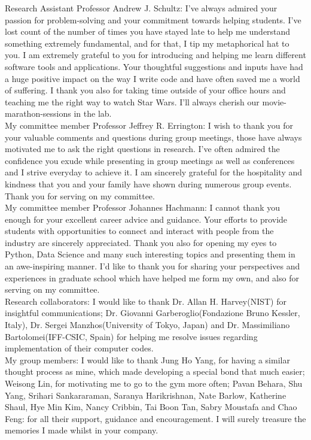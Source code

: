 \noindent Research Assistant Professor Andrew J. Schultz: I've always admired your passion for problem-solving and your commitment towards helping students. I've lost count of the number of times you have stayed late to help me understand something extremely fundamental, and for that, I tip my metaphorical hat to you. I am extremely grateful to you for introducing and helping me learn different software tools and applications. Your thoughtful suggestions and inputs have had a huge positive impact on the way I write code and have often saved me a world of suffering. I thank you also for taking time outside of your office hours and teaching me the right way to watch Star Wars. I'll always cherish our movie-marathon-sessions in the lab.\\

\noindent My committee member Professor Jeffrey R. Errington: I wish to thank you for your valuable comments and questions during group meetings, those have always motivated me to ask the right questions in research. I've often admired the confidence you exude while presenting in group meetings as well as conferences and I strive everyday to achieve it. I am sincerely grateful for the hospitality and kindness that you and your family have shown during numerous group events.  Thank you for serving on my committee.\\

\noindent My committee member Professor Johannes Hachmann: I cannot thank you enough for your excellent career advice and guidance. Your efforts to provide students with opportunities to connect and interact with people from the industry are sincerely appreciated. Thank you also for opening my eyes to Python, Data Science and many such interesting topics and presenting them in an awe-inspiring manner. I'd like to thank you for sharing your perspectives and experiences in graduate school which have helped me form my own, and also for serving on my committee.\\

\noindent Research collaborators: I would like to thank Dr. Allan H. Harvey(NIST) for insightful communications; Dr. Giovanni Garberoglio(Fondazione Bruno Kessler, Italy), Dr. Sergei Manzhos(University of Tokyo, Japan) and Dr. Massimiliano Bartolomei(IFF-CSIC, Spain) for helping me resolve issues regarding implementation of their computer codes.\\

\noindent My group members: I would like to thank Jung Ho Yang, for having a similar thought process as mine, which made developing a special bond that much easier; Weisong Lin, for motivating me to go to the gym more often; Pavan Behara, Shu Yang, Srihari Sankararaman, Saranya Harikrishnan, Nate Barlow, Katherine Shaul, Hye Min Kim, Nancy Cribbin, Tai Boon Tan, Sabry Moustafa and Chao Feng: for all their support, guidance and encouragement. I will surely treasure the memories I made whilst in your company.\\

